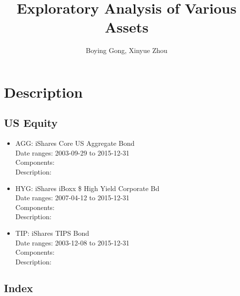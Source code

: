 \documentclass[12pt]{article}
\title{Exploratory Analysis of Various Assets}
\author{Boying Gong, Xinyue Zhou}
\begin{document}
\maketitle

\section{Description}
\subsection{US Equity}

\begin{itemize}
\item AGG: iShares Core US Aggregate Bond\\
Date ranges: 2003-09-29 to 2015-12-31\\
Components: \\
Description:
\item HYG: iShares iBoxx \$ High Yield Corporate Bd\\
Date ranges: 2007-04-12 to 2015-12-31\\
Components: \\
Description:
\item TIP: iShares TIPS Bond\\
Date ranges: 2003-12-08 to 2015-12-31\\
Components: \\
Description:
\end{itemize}

\subsection{Index}
\end{document}
